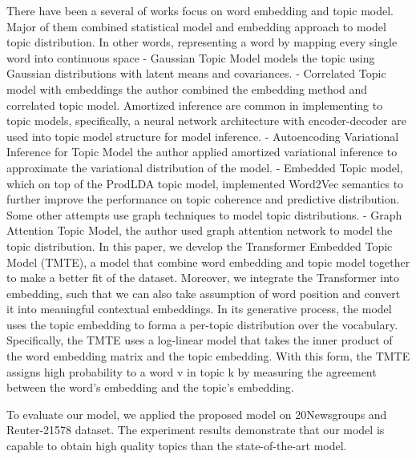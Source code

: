 There have been a several of works focus on word embedding and topic model. Major of them combined statistical model and embedding approach to model topic distribution. In other words, representing a word by mapping every single word into continuous space
-	Gaussian Topic Model models the topic using Gaussian distributions with latent means and covariances. 
-	Correlated Topic model with embeddings the author combined the embedding method and correlated topic model. 
Amortized inference are common in implementing to topic models, specifically, a neural network architecture with encoder-decoder are used into topic model structure for model inference.
-	Autoencoding Variational Inference for Topic Model the author applied amortized variational inference to approximate the variational distribution of the model.
-	Embedded Topic model, which on top of the ProdLDA topic model, implemented Word2Vec semantics to further improve the performance on topic coherence and predictive distribution.
Some other attempts use graph techniques to model topic distributions.
-	Graph Attention Topic Model, the author used graph attention network to model the topic distribution. 
In this paper, we develop the Transformer Embedded Topic Model (TMTE), a model that combine word embedding and topic model together to make a better fit of the dataset. Moreover, we integrate the Transformer into embedding, such that we can also take assumption of word position and convert it into meaningful contextual embeddings. 
In its generative process, the model uses the topic embedding to forma a per-topic distribution over the vocabulary. Specifically, the TMTE uses a log-linear model that takes the inner product of the word embedding matrix and the topic embedding.
With this form, the TMTE assigns high probability to a word v in topic k by measuring the agreement between the word’s embedding and the topic’s embedding.

To evaluate our model, we applied the proposed model on 20Newsgroups and Reuter-21578 dataset. The experiment results demonstrate that our model is capable to obtain high quality topics than the state-of-the-art model. 